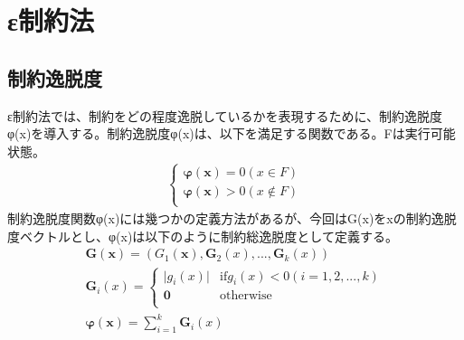 \documentclass[twocolumn,10pt]{jarticle}
\begin{document}
\section{ε制約法}
\subsection{制約逸脱度}
ε制約法では、制約をどの程度逸脱しているかを表現するために、制約逸脱度φ(x)を導入する。制約逸脱度φ(x)は、以下を満足する関数である。Fは実行可能状態。
\begin{eqnarray}
\left\{
\begin{array}{cc}
    \bm{φ(x)}=0(x\in{F})\\
    \bm{φ(x)}>0(x\notin{F})\\
\end{array}
\right.
\end{eqnarray}
制約逸脱度関数φ(x)には幾つかの定義方法があるが、今回はG(x)をxの制約逸脱度ベクトルとし、φ(x)は以下のように制約総逸脱度として定義する。
\begin{eqnarray}
\bm{G(x)}=({G}_1(\bm{x}),\bm{G}_2(x),...,\bm{G}_k(x))\\   
\bm{G}_i(x)=
\left\{
\begin{array}{cc}
     \bm|{g}_i(x)| & \mbox{if${g}_i(x)<0(i=1,2,...,k)$} \\
    \bm{0} & \mbox{otherwise}\\
\end{array}
\right.\\
\bm{φ(x)}=\sum_{i=1}^k \bm{G}_i(x)
\end{eqnarray}
\end{document}
